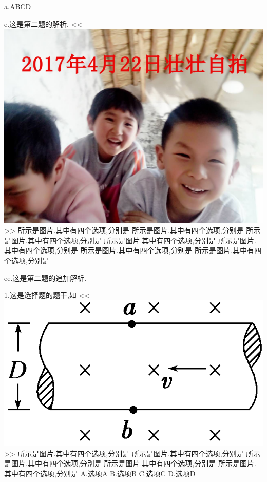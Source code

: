 \documentclass[a4paper,fontset = windowsnew]{ctexbook}
\begin{document}
\begin{choices}[exp]
  a.ABCD

  e.这是第二题的解析.
  <<
  \includegraphics[scale=0.2]{2.jpg}
  >>
  所示是图片.其中有四个选项,分别是
  所示是图片.其中有四个选项,分别是
  所示是图片.其中有四个选项,分别是
  所示是图片.其中有四个选项,分别是
  所示是图片.其中有四个选项,分别是
  所示是图片.其中有四个选项,分别是
  所示是图片.其中有四个选项,分别是

  ee.这是第二题的追加解析.

  1.这是选择题的题干,如
  <<
  \includegraphics{1.png}
  >>
  所示是图片.其中有四个选项,分别是
  所示是图片.其中有四个选项,分别是
  所示是图片.其中有四个选项,分别是
  所示是图片.其中有四个选项,分别是
  所示是图片.其中有四个选项,分别是
  A.选项A
  B.选项B
  C.选项C
  D.选项D

\end{choices}
\end{document}
